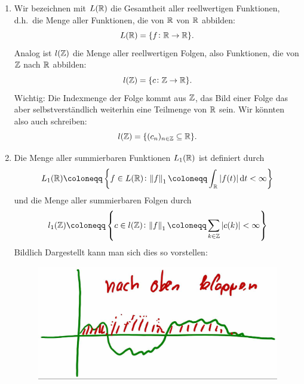 \begin{definition}[Funktionenräume] \leavevmode
\begin{enumerate}
\item Wir bezeichnen mit $ L(\mathbb{R}) $ die Gesamtheit aller reellwertigen Funktionen, d.h.\ die Menge 
  aller Funktionen, die von $ \mathbb{R} $ von $ \mathbb{R} $ abbilden:
  \[
    L(\mathbb{R}) = \{ f \colon \mathbb{R} \rightarrow \mathbb{R} \}.
  \]
  Analog ist $ l(\mathbb{Z}) $ die Menge aller reellwertigen Folgen, also Funktionen, die von $ \mathbb{Z} $ nach
  $ \mathbb{R} $ abbilden:
  \[
    l(\mathbb{Z}) = \{ c \colon \mathbb{Z} \rightarrow \mathbb{R} \}.
  \]
  Wichtig: Die Indexmenge der Folge kommt aus $ \mathbb{Z} $, das Bild einer Folge das aber 
  selbstverständlich weiterhin eine Teilmenge von $ \mathbb{R} $ sein. Wir könnten also auch schreiben:
  \[
    l(\mathbb{Z}) = \{ (c_{n})_{n \in \mathbb{Z}} \subseteq \mathbb{R} \}.
  \]
\item Die Menge aller summierbaren Funktionen $ L_{1}(\mathbb{R}) $ ist definiert durch
\[ 
  L_{1}(\R) \coloneqq \left\{
    f \in L(\R) \colon \norm{f}_{1} \coloneqq \int_{\R} |f(t)| \dif t < \infty
  \right\}
\]
und die Menge aller summierbaren Folgen durch
\[ 
  l_{1}(\Z) \coloneqq \left\{
    c \in l(\Z) \colon \norm{f}_{1} \coloneqq \sum_{k \in \Z} |c(k)| < \infty
  \right\}
\]
Bildlich Dargestellt kann man sich dies so vorstellen:
\begin{figure}[h]
\centering
\includegraphics[width=0.5\linewidth]{Bilder/L1}
\caption{}
\label{fig:L1}
\end{figure}





\end{enumerate}
\end{definition}
